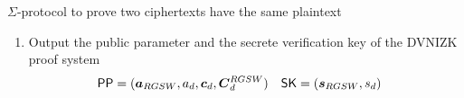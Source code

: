 \begin{section}{$\Sigma$-protocol to prove two ciphertexts have the same plaintext~\label{ProofSamePlaintext}}
\begin{description}
\begin{enumerate}
\begin{enumerate}
        \item Sample polynomials $v,e' \sample \mathcal{D}_{R_q, \sigma_{BV}}$ and $e'' \sample  \mathcal{D}_{R_q, \sigma_{BV}'}$.
        \item Compute the following ciphertexts
          \begin{align*}(\PK_1, \SK_1) &\gets PLWE.\Setup(1^\lambda) &
            \mat{C}_d^{RGSW} &= \vec{a}_{RGSW} \cdot \mat{R}_{RGSW} + \mat{E}_{RSGW} +  d \cdot \mat{G} &
            \vec{c}_d &= \begin{bmatrix} b_d v + 2e'' + \mu \\ a_d v + 2e' \end{bmatrix}
          \end{align*}
        \end{enumerate}
        \item Output the public parameter and the secrete verification key of the DVNIZK proof system
        \begin{align*}
          \PPP &= (\vec{a}_{RGSW}, a_d, \vec{c}_d, \vec{C}_d^{RGSW}) & \SK &= (\vec{s}_{RGSW}, s_d)
        \end{align*}
      \end{enumerate}




\end{description}
\end{section}
